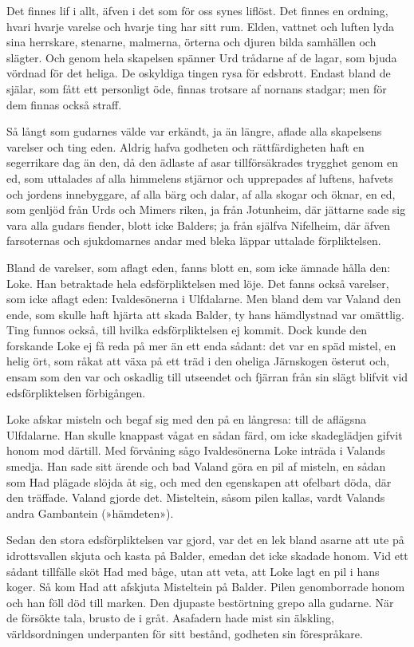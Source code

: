 Det finnes lif i allt, äfven i det som för oss synes liflöst. Det finnes
en ordning, hvari hvarje varelse och hvarje ting har sitt rum. Elden,
vattnet och luften lyda sina herrskare, stenarne, malmerna, örterna och
djuren bilda samhällen och slägter. Och genom hela skapelsen spänner Urd
trådarne af de lagar, som bjuda vördnad för det heliga. De oskyldiga
tingen rysa för edsbrott. Endast bland de själar, som fått ett
personligt öde, finnas trotsare af nornans stadgar; men för dem finnas
också straff.

Så långt som gudarnes välde var erkändt, ja än längre, aflade alla
skapelsens varelser och ting eden. Aldrig hafva godheten och
rättfärdigheten haft en segerrikare dag än den, då den ädlaste af asar
tillförsäkrades trygghet genom en ed, som uttalades af alla himmelens
stjärnor och upprepades af luftens, hafvets och jordens innebyggare, af
alla bärg och dalar, af alla skogar och öknar, en ed, som genljöd från
Urds och Mimers
riken, ja från Jotunheim, där jättarne sade sig vara alla gudars
fiender, blott icke Balders; ja från själfva Nifelheim, där äfven
farsoternas och sjukdomarnes andar med bleka läppar uttalade
förpliktelsen.

Bland de varelser, som aflagt eden, fanns blott en, som icke ämnade
hålla den: Loke. Han betraktade hela edsförpliktelsen med löje. Det
fanns också varelser, som icke aflagt eden: Ivaldesönerna i Ulfdalarne.
Men bland dem var Valand den ende, som skulle haft hjärta att skada
Balder, ty hans hämdlystnad var omättlig. Ting funnos också, till hvilka
edsförpliktelsen ej kommit. Dock kunde den forskande Loke ej få reda på
mer än ett enda sådant: det var en späd mistel, en helig ört, som råkat
att växa på ett träd i den oheliga Järnskogen österut och, ensam som den
var och oskadlig till utseendet och fjärran från sin slägt blifvit vid
edsförpliktelsen förbigången.

Loke afskar misteln och begaf sig med den på en långresa: till de
aflägsna Ulfdalarne. Han skulle knappast vågat en sådan färd, om icke
skadeglädjen gifvit honom mod därtill. Med förvåning sågo Ivaldesönerna
Loke inträda i Valands smedja. Han sade sitt ärende och bad Valand göra
en pil af misteln, en sådan som Had plägade slöjda åt sig, och med den
egenskapen att ofelbart döda, där den träffade. Valand gjorde det.
Misteltein, såsom pilen kallas, vardt Valands andra Gambantein
(»hämdeten»).

Sedan den stora edsförpliktelsen var gjord, var det en lek bland asarne
att ute på idrottsvallen skjuta och kasta på Balder, emedan det icke
skadade honom. Vid ett sådant tillfälle sköt Had med båge, utan att
veta, att Loke lagt en pil i hans koger. Så kom Had att afskjuta
Misteltein på Balder. Pilen genomborrade honom och han föll död till
marken. Den djupaste bestörtning grepo alla gudarne. När de försökte
tala, brusto de i gråt. Asafadern hade mist sin älskling,
världsordningen underpanten för sitt bestånd, godheten sin förespråkare.

